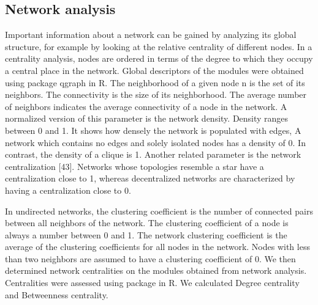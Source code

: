 \documentclass[a4paper]{article}
\begin{document}
\subsection{Network analysis}
Important information about a network can be gained by analyzing its global structure, for example by looking at the relative centrality of different nodes. In a centrality analysis, nodes are ordered in terms of the degree to which they occupy a central place in the network. Global descriptors of the modules were obtained using package qgraph in R. The neighborhood of a given node n is the set of its neighbors. The connectivity is the size of its neighborhood. The average number of neighbors indicates the average connectivity of a node in the network. A normalized version of this parameter is the network density. Density ranges between 0 and 1. It shows how densely the network is populated with edges, A network which contains no edges and solely isolated nodes has a density of 0. In contrast, the density of a clique is 1. Another related parameter is the network centralization [43]. Networks whose topologies resemble a star have a centralization close to 1, whereas decentralized networks are characterized by having a centralization close to 0.

In undirected networks, the clustering coefficient is the number of connected pairs between all neighbors of the network. The clustering coefficient of a node is always a number between 0 and 1. The network clustering coefficient is the average of the clustering coefficients for all nodes in the network. Nodes with less than two neighbors are assumed to have a clustering coefficient of 0. We then determined network centralities on the modules obtained from network analysis. Centralities were assessed using package in R. We calculated Degree centrality and Betweenness centrality.


\end{document}
